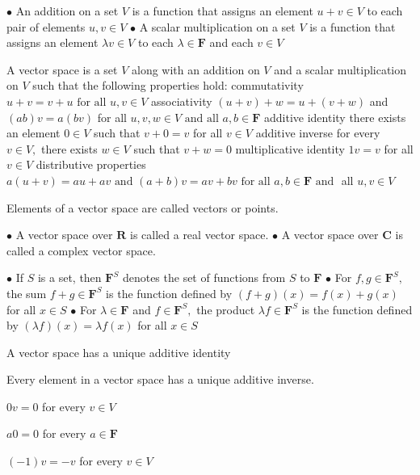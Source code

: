 
$\bullet$ An addition on a set $V$ is a function that assigns an element $u+v \in V$
to each pair of elements $u, v \in V$
$\bullet$ A scalar multiplication on a set $V$ is a function that assigns an element $\lambda v \in V$ to each $\lambda \in \mathbf{F}$ and each $v \in V$

A vector space is a set $V$ along with an addition on $V$ and a scalar multiplication on $V$ such that the following properties hold:
commutativity
$
u+v=v+u \text { for all } u, v \in V
$
associativity $(u+v)+w=u+(v+w)$ and $(a b) v=a(b v)$ for all $u, v, w \in V 
\text { and all } a, b \in \mathbf{F}
$
additive identity there exists an element $0 \in V$ such that $v+0=v$ for all $v \in V$
additive inverse
for every $v \in V,$ there exists $w \in V$ such that $v+w=0$
multiplicative identity
$1 v=v$ for all $v \in V$
distributive properties
$
a(u+v)=a u+a v \text { and }(a+b) v=a v+b v \text { for all } a, b \in \mathbf{F} \text { and }
$
all $u, v \in V$

Elements of a vector space are called vectors or points.

$\bullet$ A vector space over $\mathbf{R}$ is called a real vector space.
$\bullet$ A vector space over $\mathbf{C}$ is called a complex vector space.

$\bullet$ If $S$ is a set, then $\mathbf{F}^{S}$ denotes the set of functions from $S$ to $\mathbf{F}$
$\bullet$ For $f, g \in \mathbf{F}^{S},$ the sum $f+g \in \mathbf{F}^{S}$ is the function defined by
$
(f+g)(x)=f(x)+g(x)
$
for all $x \in S$
$\bullet$ For $\lambda \in \mathbf{F}$ and $f \in \mathbf{F}^{S},$ the product $\lambda f \in \mathbf{F}^{S}$ is the function defined by
$
(\lambda f)(x)=\lambda f(x)
$
for all $x \in S$

A vector space has a unique additive identity

Every element in a vector space has a unique additive inverse.

$0 v=0$ for every $v \in V$

$a 0=0$ for every $a \in \mathbf{F}$

$(-1) v=-v$ for every $v \in V$